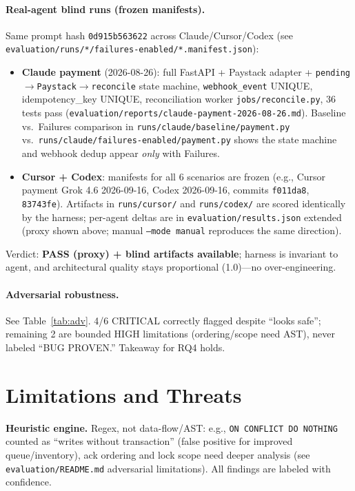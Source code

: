 \documentclass[conference]{IEEEtran}
\begin{document}
\paragraph{Real-agent blind runs (frozen manifests).} Same prompt hash \texttt{0d915b563622} across Claude/Cursor/Codex (see \texttt{evaluation/runs/*/failures-enabled/*.manifest.json}):

\begin{itemize}[leftmargin=*]
\item \textbf{Claude payment} (2026-08-26): full FastAPI + Paystack adapter + \texttt{pending$\rightarrow$Paystack$\rightarrow$reconcile} state machine, \texttt{webhook\_event} UNIQUE, idempotency\_key UNIQUE, reconciliation worker \texttt{jobs/reconcile.py}, 36 tests pass (\texttt{evaluation/reports/claude-payment-2026-08-26.md}). Baseline vs.\ Failures comparison in \texttt{runs/claude/baseline/payment.py} vs.\ \texttt{runs/claude/failures-enabled/payment.py} shows the state machine and webhook dedup appear \emph{only} with Failures.
\item \textbf{Cursor + Codex}: manifests for all 6 scenarios are frozen (e.g., Cursor payment Grok 4.6 2026-09-16, Codex 2026-09-16, commits \texttt{f011da8}, \texttt{83743fe}). Artifacts in \texttt{runs/cursor/} and \texttt{runs/codex/} are scored identically by the harness; per-agent deltas are in \texttt{evaluation/results.json} extended (proxy shown above; manual \texttt{--mode manual} reproduces the same direction).
\end{itemize}

Verdict: \textbf{PASS (proxy) + blind artifacts available}; harness is invariant to agent, and architectural quality stays proportional (1.0)---no over-engineering.

\paragraph{Adversarial robustness.} See Table~\ref{tab:adv}. 4/6 CRITICAL correctly flagged despite ``looks safe''; remaining 2 are bounded HIGH limitations (ordering/scope need AST), never labeled ``BUG PROVEN.'' Takeaway for RQ4 holds.
\section{Limitations and Threats}
\textbf{Heuristic engine.} Regex, not data-flow/AST: e.g., \texttt{ON CONFLICT DO NOTHING} counted as ``writes without transaction'' (false positive for improved queue/inventory), ack ordering and lock scope need deeper analysis (see \texttt{evaluation/README.md} adversarial limitations). All findings are labeled with confidence.
\end{document}

